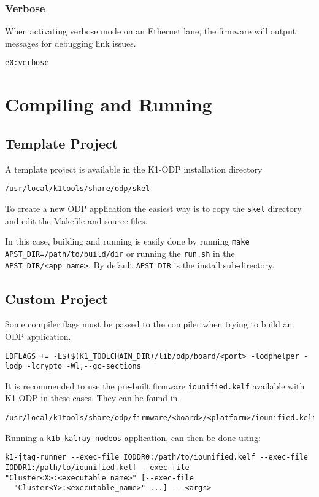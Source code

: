 \documentclass{trkalray}
\begin{document}
\subsubsection{Verbose}

When activating verbose mode on an Ethernet lane, the firmware will
output messages for debugging link issues.
\begin{lstlisting}
e0:verbose
\end{lstlisting}

\newpage
\section{Compiling and Running}

\subsection{Template Project}
A template project is available in the K1-ODP installation directory
\begin{lstlisting}
/usr/local/k1tools/share/odp/skel
\end{lstlisting}

To create a new ODP application the easiest way is to copy the
\texttt{skel} directory and edit the Makefile and source files.

In this case, building and running is easily done by running
\texttt{make APST\_DIR=/path/to/build/dir} or running the
\texttt{run.sh} in the \texttt{APST\_DIR/<app\_name>}.
By default \texttt{APST\_DIR} is the install sub-directory.


\subsection{Custom Project}

Some compiler flags must be passed to the compiler when trying to
build an ODP application.
\begin{lstlisting}
LDFLAGS += -L$($(K1_TOOLCHAIN_DIR)/lib/odp/board/<port> -lodphelper -lodp -lcrypto -Wl,--gc-sections
\end{lstlisting}

It is recommended to use the pre-built firmware
\texttt{iounified.kelf} available with K1-ODP in these cases.
They can be found in
\begin{lstlisting}
/usr/local/k1tools/share/odp/firmware/<board>/<platform>/iounified.kelf
\end{lstlisting}

Running a \texttt{k1b-kalray-nodeos} application, can then be done using:
\begin{lstlisting}
k1-jtag-runner --exec-file IODDR0:/path/to/iounified.kelf --exec-file
IODDR1:/path/to/iounified.kelf --exec-file
"Cluster<X>:<executable_name>" [--exec-file
  "Cluster<Y>:<executable_name>" ...] -- <args>
\end{lstlisting}
\end{document}
